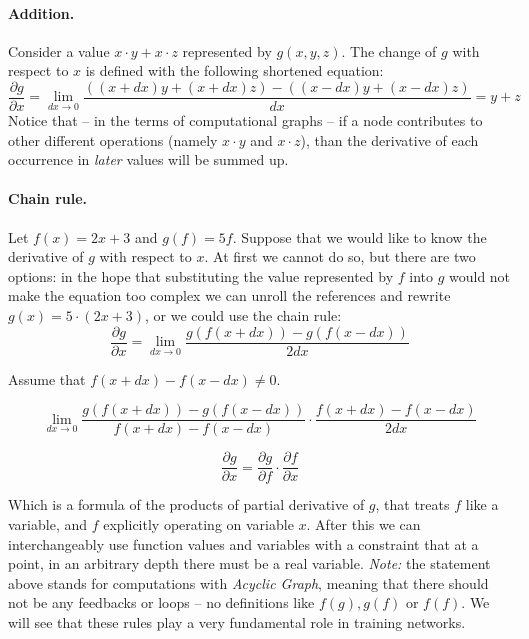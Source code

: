 \paragraph{Addition.}
Consider a value $x\cdot y + x\cdot z$ represented by $g(x,y,z)$.
The change of $g$ with respect to $x$ is defined with the following shortened equation:
\begin{equation}
    \frac{\partial g}{\partial x} = \lim_{dx\rightarrow 0} \frac{((x+dx)y +(x+dx)z)-((x-dx)y +(x-dx)z)}{dx}=y+z
\end{equation}
Notice that -- in the terms of computational graphs -- if a node contributes to other different operations (namely $x\cdot y$ and $x\cdot z$), 
than the derivative of each occurrence in \emph{later} values will be summed up. 

\paragraph{Chain rule.}
Let $f(x)=2x+3$ and $g(f)=5f$. Suppose that we would like to know the derivative of $g$ with respect to $x$.
At first we cannot do so, but there are two options: in the hope that substituting the value represented by $f$ into $g$ would not make the equation too complex we can unroll the references and rewrite $g(x)=5\cdot(2x + 3)$, or we could use the chain rule:
$$
    \frac{\partial g}{\partial x} = \lim_{dx \rightarrow 0} \frac{g(f(x+dx)) - g(f(x-dx))}{2dx}
$$

\begin{center}
    Assume that $f(x+dx)-f(x-dx) \neq 0$.
\end{center}

$$
    \lim_{dx \rightarrow 0} \frac{g(f(x+dx)) - g(f(x-dx) ) }{f(x+dx)-f(x-dx)} \cdot \frac{f(x+dx)-f(x-dx)}{2dx}
$$

\begin{equation}\label{eq:chain}
    \frac{\partial g}{\partial x} = \frac{\partial g}{\partial f} \cdot \frac{\partial f}{\partial x}
\end{equation}

Which is a formula of the products of partial derivative of $g$, that treats $f$ like a variable, and $f$ explicitly operating on variable $x$.
After this we can interchangeably use function values and variables with a constraint that at a point, in an arbitrary depth there must be a real variable.
\emph{Note:} the statement above stands for computations with \emph{Acyclic Graph}, meaning that there should not be any feedbacks or loops -- no definitions like $f(g), g(f)$ or $f(f)$.
We will see that these rules play a very fundamental role in training networks.

